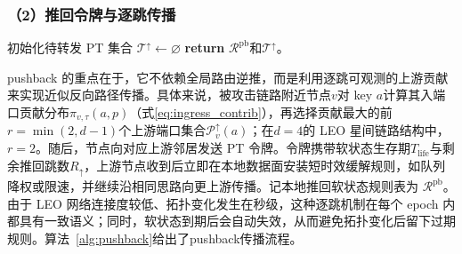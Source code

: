 \subsubsection*{（2）推回令牌与逐跳传播}

\begin{algorithm}[H]
\caption{逐跳推回（Hop-by-hop Pushback）}
\label{alg:pushback}
\BlankLine
{}
初始化待转发 PT 集合 $\mathcal{T}^{\uparrow}\leftarrow\varnothing$\;
\BlankLine
{}
\textbf{return} $\mathcal{R}^{\text{pb}}$和$\mathcal{T}^{\uparrow}$。
\end{algorithm}

pushback 的重点在于，它不依赖全局路由逆推，而是利用逐跳可观测的上游贡献来实现近似反向路径传播。具体来说，被攻击链路附近节点$v$对 key $a$计算其入端口贡献分布$\pi_{v,\tau}(a,p)$（式\eqref{eq:ingress_contrib}），再选择贡献最大的前$r=\min(2,d-1)$个上游端口集合$\mathcal{P}^\uparrow_{v}(a)$；在$d=4$的 LEO 星间链路结构中，$r=2$。随后，节点向对应上游邻居发送 PT 令牌。令牌携带软状态生存期$T_{\text{life}}$与剩余推回跳数$R_{\uparrow}$，上游节点收到后立即在本地数据面安装短时效缓解规则，如队列降权或限速，并继续沿相同思路向更上游传播。记本地推回软状态规则表为 $\mathcal{R}^{\text{pb}}$。由于 LEO 网络连接度较低、拓扑变化发生在秒级，这种逐跳机制在每个 epoch 内都具有一致语义；同时，软状态到期后会自动失效，从而避免拓扑变化后留下过期规则。算法~\ref{alg:pushback}给出了pushback传播流程。

